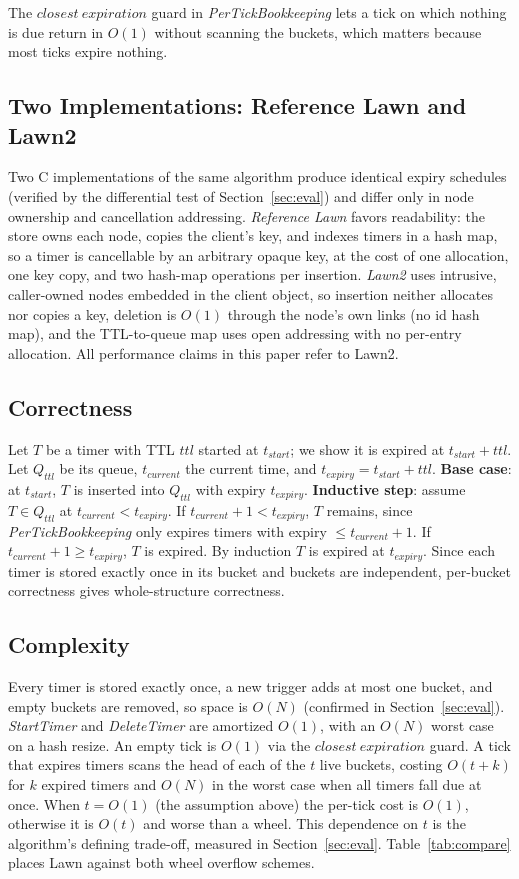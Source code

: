 \documentclass[conference]{IEEEtran}
\begin{document}
The $closest\ expiration$ guard in \textit{PerTickBookkeeping} lets a tick on which nothing is due return in $O(1)$ without scanning the buckets, which matters because most ticks expire nothing.

\subsection{Two Implementations: Reference Lawn and Lawn2}
\label{sec:impls}
Two C implementations of the same algorithm produce identical expiry schedules (verified by the differential test of Section~\ref{sec:eval}) and differ only in node ownership and cancellation addressing. \emph{Reference Lawn} favors readability: the store owns each node, copies the client's key, and indexes timers in a hash map, so a timer is cancellable by an arbitrary opaque key, at the cost of one allocation, one key copy, and two hash-map operations per insertion. \emph{Lawn2} uses intrusive, caller-owned nodes embedded in the client object, so insertion neither allocates nor copies a key, deletion is $O(1)$ through the node's own links (no id hash map), and the TTL-to-queue map uses open addressing with no per-entry allocation. All performance claims in this paper refer to Lawn2.

\subsection{Correctness}
Let $T$ be a timer with TTL $ttl$ started at $t_{start}$; we show it is expired at $t_{start}+ttl$. Let $Q_{ttl}$ be its queue, $t_{current}$ the current time, and $t_{expiry}=t_{start}+ttl$. \textbf{Base case}: at $t_{start}$, $T$ is inserted into $Q_{ttl}$ with expiry $t_{expiry}$. \textbf{Inductive step}: assume $T \in Q_{ttl}$ at $t_{current}<t_{expiry}$. If $t_{current}+1<t_{expiry}$, $T$ remains, since \textit{PerTickBookkeeping} only expires timers with expiry $\leq t_{current}+1$. If $t_{current}+1 \geq t_{expiry}$, $T$ is expired. By induction $T$ is expired at $t_{expiry}$. Since each timer is stored exactly once in its bucket and buckets are independent, per-bucket correctness gives whole-structure correctness.

\subsection{Complexity}
Every timer is stored exactly once, a new trigger adds at most one bucket, and empty buckets are removed, so space is $O(N)$ (confirmed in Section~\ref{sec:eval}). \textit{StartTimer} and \textit{DeleteTimer} are amortized $O(1)$, with an $O(N)$ worst case on a hash resize. An empty tick is $O(1)$ via the $closest\ expiration$ guard. A tick that expires timers scans the head of each of the $t$ live buckets, costing $O(t+k)$ for $k$ expired timers and $O(N)$ in the worst case when all timers fall due at once. When $t=O(1)$ (the assumption above) the per-tick cost is $O(1)$, otherwise it is $O(t)$ and worse than a wheel. This dependence on $t$ is the algorithm's defining trade-off, measured in Section~\ref{sec:eval}. Table~\ref{tab:compare} places Lawn against both wheel overflow schemes.
\end{document}
